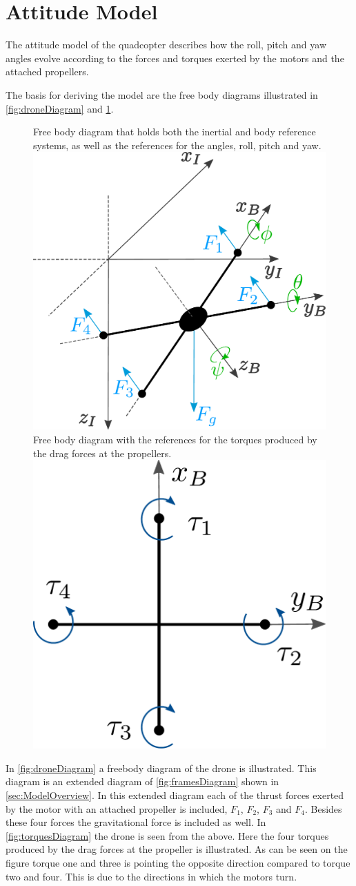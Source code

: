 \section{Attitude Model} \label{sec:AttitudeModel}
The attitude model of the quadcopter describes how the roll, pitch and yaw angles evolve according to the forces and torques exerted by the motors and the attached propellers. 

The basis for deriving the model are the free body diagrams illustrated in \autoref{fig:droneDiagram} and \ref{fig:torquesDiagram}. 
%
\begin{figure}[H]
  \captionbox
  {
    Free body diagram that holds both the inertial and body reference systems, as well as the references for the angles, roll, pitch and yaw.
    \label{fig:droneDiagram}
  }
  {
    \includegraphics[width=.48\textwidth]{figures/droneDiagram}
  }
  \hspace{5pt}
  \captionbox
  {
    Free body diagram with the references for the torques produced by the drag forces at the propellers.
    \label{fig:torquesDiagram}
  }
  {
    \includegraphics[width=.42\textwidth]{figures/torquesDiagram}
    \vspace{.5cm}
  }
\end{figure}
%
In \autoref{fig:droneDiagram} a freebody diagram of the drone is illustrated. This diagram is an extended diagram of \autoref{fig:framesDiagram} shown in \autoref{sec:ModelOverview}. In this extended diagram each of the thrust forces exerted by the motor with an attached propeller is included, $F_1$, $F_2$, $F_3$ and $F_4$. Besides these four forces the gravitational force is included as well. In \autoref{fig:torquesDiagram} the drone is seen from the above. Here the four torques produced by the drag forces at the propeller is illustrated. As can be seen on the figure torque one and three is pointing the opposite direction compared to torque two and four. This is due to the directions in which the motors turn.  

